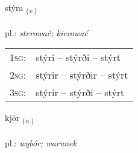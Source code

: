 \documentclass[frontgrid, backgrid]{flacards}\usepackage[]{graphicx}\usepackage[]{xcolor}
\begin{document}
\renewcommand{\flhead}{\vskip5pt \fboxsep=0pt {\small\bfseries\footnotesize Sagnorð | Verb}}
\renewcommand{\fcfoot}{\vskip5pt \fboxsep=0pt \hspace{2pt}{\small\bfseries\footnotesize 2K}}

\renewcommand{\blhead}{\vskip5pt {\small\bfseries\footnotesize Sagnorð | Verb }}
\renewcommand{\bcfoot}{\vskip5pt \hspace{2pt}{\small\bfseries\footnotesize 2K}}


{stýra \small{\textsubscript{(\textit{v.})}} \\[1ex] %
\textphonetic{[stiːra]} \\
pl.: \emph{sterować; kierować} \\  [2ex]
\renewcommand*{\arraystretch}{0.8}
\begin{tabular}{p{1cm}l}
\textsc{1sg}: & stýri -- stýrði -- stýrt \\ 
\textsc{2sg}: & stýrir -- stýrðir -- stýrt \\ 
\textsc{3sg}: & stýrir -- stýrði -- stýrt \\ 
\end{tabular}
}

\renewcommand{\flhead}{\vskip5pt \fboxsep=0pt {\small\bfseries\footnotesize Nafnorð | Noun}}
\renewcommand{\fcfoot}{\vskip5pt \fboxsep=0pt \hspace{2pt}{\small\bfseries\footnotesize 2K}}

\renewcommand{\blhead}{\vskip5pt {\small\bfseries\footnotesize Nafnorð | Noun }}
\renewcommand{\bcfoot}{\vskip5pt \hspace{2pt}{\small\bfseries\footnotesize 2K}}


{kjör \small{\textsubscript{(\textit{n.})}} \\[1ex] %
\textphonetic{[cʰœːr]} \\
pl.: \emph{wybór; warunek} \\  [2ex]
\renewcommand*{\arraystretch}{0.8}
}
\end{document}
